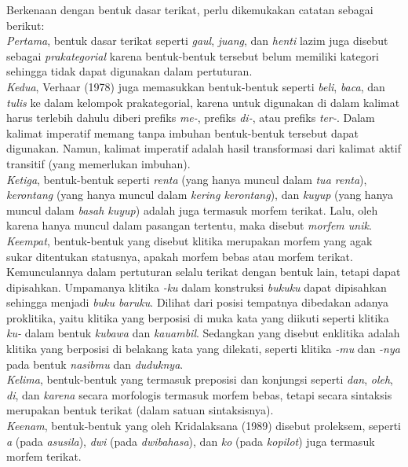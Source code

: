 \begin{enumerate}
	Berkenaan dengan bentuk dasar terikat, perlu dikemukakan catatan sebagai berikut:\\
	\textit{Pertama}, bentuk dasar terikat seperti \textit{gaul}, \textit{juang}, dan \textit{henti} lazim juga disebut sebagai \textit{prakategorial} karena bentuk-bentuk tersebut belum memiliki kategori sehingga tidak dapat digunakan dalam pertuturan.\\
	\textit{Kedua}, Verhaar (1978) juga memasukkan bentuk-bentuk seperti \textit{beli}, \textit{baca}, dan \textit{tulis} ke dalam kelompok prakategorial, karena untuk digunakan di dalam kalimat harus terlebih dahulu diberi prefiks \textit{me-}, prefiks \textit{di-}, atau prefiks \textit{ter-}. Dalam kalimat imperatif memang tanpa imbuhan bentuk-bentuk tersebut dapat digunakan. Namun, kalimat imperatif adalah hasil transformasi dari kalimat aktif transitif (yang memerlukan imbuhan).\\
	\textit{Ketiga}, bentuk-bentuk seperti \textit{renta} (yang hanya muncul dalam \textit{tua renta}), \textit{kerontang} (yang hanya muncul dalam \textit{kering kerontang}), dan \textit{kuyup} (yang hanya muncul dalam \textit{basah kuyup}) adalah juga termasuk morfem terikat. Lalu, oleh karena hanya muncul dalam pasangan tertentu, maka disebut \textit{morfem unik}.\\
	\textit{Keempat}, bentuk-bentuk yang disebut klitika merupakan morfem yang agak sukar ditentukan statusnya, apakah morfem bebas atau morfem terikat. Kemunculannya dalam pertuturan selalu terikat dengan bentuk lain, tetapi dapat dipisahkan. Umpamanya klitika \textit{-ku} dalam konstruksi \textit{bukuku} dapat dipisahkan sehingga menjadi \textit{buku baruku}. Dilihat dari posisi tempatnya dibedakan adanya proklitika, yaitu klitika yang berposisi di muka kata yang diikuti seperti klitika \textit{ku-} dalam bentuk \textit{kubawa} dan \textit{kauambil}. Sedangkan yang disebut enklitika adalah klitika yang berposisi di belakang kata yang dilekati, seperti klitika \textit{-mu} dan \textit{-nya} pada bentuk \textit{nasibmu} dan \textit{duduknya}.\\
	\textit{Kelima}, bentuk-bentuk yang termasuk preposisi dan konjungsi seperti \textit{dan}, \textit{oleh}, \textit{di}, dan \textit{karena} secara morfologis termasuk morfem bebas, tetapi secara sintaksis merupakan bentuk terikat (dalam satuan sintaksisnya).\\
	\textit{Keenam}, bentuk-bentuk yang oleh Kridalaksana (1989) disebut proleksem, seperti \textit{a} (pada \textit{asusila}), \textit{dwi} (pada \textit{dwibahasa}), dan \textit{ko} (pada \textit{kopilot}) juga termasuk morfem terikat.
	

\end{enumerate}
